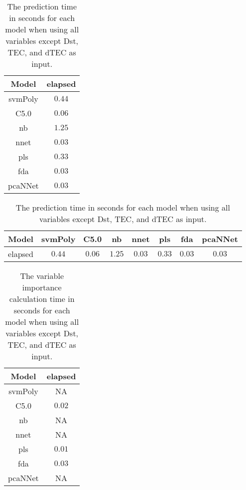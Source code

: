\begin{table}[!ht]
	\centering
	\begin{tabular}{|c|c|}
		\hline
		Model & elapsed \\ \hline
		svmPoly & $0.44$ \\ \hline
		C5.0 & $0.06$ \\ \hline
		nb & $1.25$ \\ \hline
		nnet & $0.03$ \\ \hline
		pls & $0.33$ \\ \hline
		fda & $0.03$ \\ \hline
		pcaNNet & $0.03$ \\ \hline
	\end{tabular}
	\caption{The prediction time in seconds for each model when using all variables except Dst, TEC, and dTEC as input.}
	\label{tab:time:noTEC:predict}
\end{table}

\begin{table}[!ht]
	\centering
	\begin{tabular}{|c|c|c|c|c|c|c|c|}
		\hline
		Model & svmPoly & C5.0 & nb & nnet & pls & fda & pcaNNet \\ \hline
		elapsed & $0.44$ & $0.06$ & $1.25$ & $0.03$ & $0.33$ & $0.03$ & $0.03$ \\ \hline
	\end{tabular}
	\caption{The prediction time in seconds for each model when using all variables except Dst, TEC, and dTEC as input.}
	\label{tab:time:reverse:noTEC:predict}
\end{table}

\begin{table}[!ht]
	\centering
	\begin{tabular}{|c|c|}
		\hline
		Model & elapsed \\ \hline
		svmPoly & NA \\ \hline
		C5.0 & $0.02$ \\ \hline
		nb & NA \\ \hline
		nnet & NA \\ \hline
		pls & $0.01$ \\ \hline
		fda & $0.03$ \\ \hline
		pcaNNet & NA \\ \hline
	\end{tabular}
	\caption{The variable importance calculation time in seconds for each model when using all variables except Dst, TEC, and dTEC as input.}
	\label{tab:time:noTEC:importance}
\end{table}

